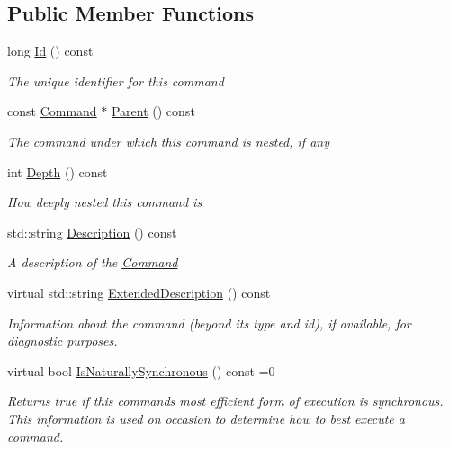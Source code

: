 \subsection*{Public Member Functions}
\begin{DoxyCompactItemize}
\item 
long \mbox{\hyperlink{class_command_lib_1_1_command_a00a3047609fda3d69b828b7850624389}{Id}} () const
\begin{DoxyCompactList}\small\item\em The unique identifier for this command\end{DoxyCompactList}\item 
const \mbox{\hyperlink{class_command_lib_1_1_command}{Command}} $\ast$ \mbox{\hyperlink{class_command_lib_1_1_command_a19a55aef338aad892fc105b2e1f8700f}{Parent}} () const
\begin{DoxyCompactList}\small\item\em The command under which this command is nested, if any\end{DoxyCompactList}\item 
int \mbox{\hyperlink{class_command_lib_1_1_command_a28e3c6c7f6467cbeffe287984c3f012d}{Depth}} () const
\begin{DoxyCompactList}\small\item\em How deeply nested this command is\end{DoxyCompactList}\item 
std\+::string \mbox{\hyperlink{class_command_lib_1_1_command_a03783e0aea82f820805b8c4e9cc8b43e}{Description}} () const
\begin{DoxyCompactList}\small\item\em A description of the \mbox{\hyperlink{class_command_lib_1_1_command}{Command}}\end{DoxyCompactList}\item 
virtual std\+::string \mbox{\hyperlink{class_command_lib_1_1_command_a795a185509e7b0fc1606b3b62fe17fbb}{Extended\+Description}} () const
\begin{DoxyCompactList}\small\item\em Information about the command (beyond its type and id), if available, for diagnostic purposes. \end{DoxyCompactList}\item 
virtual bool \mbox{\hyperlink{class_command_lib_1_1_command_a4ccad987c43709c44c20132c3890b585}{Is\+Naturally\+Synchronous}} () const =0
\begin{DoxyCompactList}\small\item\em Returns true if this command\textquotesingle{}s most efficient form of execution is synchronous. This information is used on occasion to determine how to best execute a command. \end{DoxyCompactList}\item 

\end{DoxyCompactItemize}
